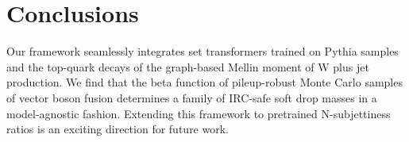 \section{Conclusions}\label{sec:conclusions}

Our framework seamlessly integrates set transformers trained on Pythia
samples and the top-quark decays of the graph-based Mellin moment of W
plus jet production. We find that the beta function of pileup-robust
Monte Carlo samples of vector boson fusion determines a family of
IRC-safe soft drop masses in a model-agnostic fashion. Extending this
framework to pretrained N-subjettiness ratios is an exciting direction
for future work.

